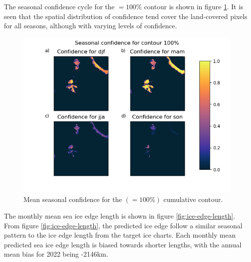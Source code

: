 \documentclass[../main/thesis.tex]{subfiles}
\begin{document}
The seasonal confidence cycle for the $=100\%$ contour is shown in figure \ref{fig:confidence_seasonal}. It is seen that the spatial distribution of confidence tend cover the land-covered pixels for all seasons, although with varying levels of confidence.

\begin{figure}
    \centering
    \includegraphics[width=\textwidth]{confidence_test_contour_6}
    \caption{\label{fig:confidence_seasonal}Mean seasonal confidence for the $(=100\%)$ cumulative contour.}
\end{figure}

The monthly mean sea ice edge length is shown in figure \ref{fig:ice-edge-length}. From figure \ref{fig:ice-edge-length}, the predicted ice edge follow a similar seasonal pattern to the ice edge length from the target ice charts. Each monthly mean predicted sea ice edge length is biased towards shorter lengths, with the annual mean bias for 2022 being -2146km.
\end{document}
